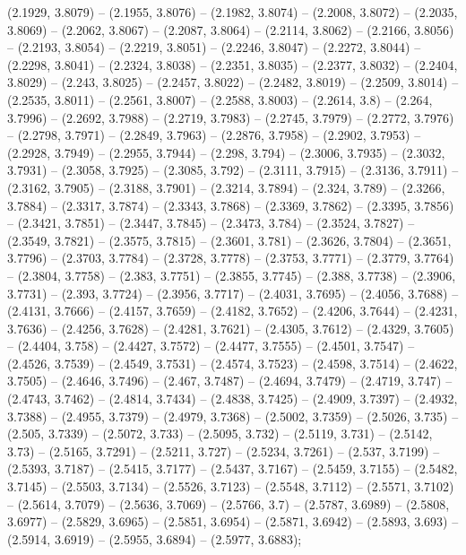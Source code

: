 (2.1929, 3.8079) -- (2.1955, 3.8076) -- (2.1982, 3.8074) -- (2.2008, 3.8072) -- (2.2035, 3.8069) -- (2.2062, 3.8067) -- (2.2087, 3.8064) -- (2.2114, 3.8062) -- (2.2166, 3.8056) -- (2.2193, 3.8054) -- (2.2219, 3.8051) -- (2.2246, 3.8047) -- (2.2272, 3.8044) -- (2.2298, 3.8041) -- (2.2324, 3.8038) -- (2.2351, 3.8035) -- (2.2377, 3.8032) -- (2.2404, 3.8029) -- (2.243, 3.8025) -- (2.2457, 3.8022) -- (2.2482, 3.8019) -- (2.2509, 3.8014) -- (2.2535, 3.8011) -- (2.2561, 3.8007) -- (2.2588, 3.8003) -- (2.2614, 3.8) -- (2.264, 3.7996) -- (2.2692, 3.7988) -- (2.2719, 3.7983) -- (2.2745, 3.7979) -- (2.2772, 3.7976) -- (2.2798, 3.7971) -- (2.2849, 3.7963) -- (2.2876, 3.7958) -- (2.2902, 3.7953) -- (2.2928, 3.7949) -- (2.2955, 3.7944) -- (2.298, 3.794) -- (2.3006, 3.7935) -- (2.3032, 3.7931) -- (2.3058, 3.7925) -- (2.3085, 3.792) -- (2.3111, 3.7915) -- (2.3136, 3.7911) -- (2.3162, 3.7905) -- (2.3188, 3.7901) -- (2.3214, 3.7894) -- (2.324, 3.789) -- (2.3266, 3.7884) -- (2.3317, 3.7874) -- (2.3343, 3.7868) -- (2.3369, 3.7862) -- (2.3395, 3.7856) -- (2.3421, 3.7851) -- (2.3447, 3.7845) -- (2.3473, 3.784) -- (2.3524, 3.7827) -- (2.3549, 3.7821) -- (2.3575, 3.7815) -- (2.3601, 3.781) -- (2.3626, 3.7804) -- (2.3651, 3.7796) -- (2.3703, 3.7784) -- (2.3728, 3.7778) -- (2.3753, 3.7771) -- (2.3779, 3.7764) -- (2.3804, 3.7758) -- (2.383, 3.7751) -- (2.3855, 3.7745) -- (2.388, 3.7738) -- (2.3906, 3.7731) -- (2.393, 3.7724) -- (2.3956, 3.7717) -- (2.4031, 3.7695) -- (2.4056, 3.7688) -- (2.4131, 3.7666) -- (2.4157, 3.7659) -- (2.4182, 3.7652) -- (2.4206, 3.7644) -- (2.4231, 3.7636) -- (2.4256, 3.7628) -- (2.4281, 3.7621) -- (2.4305, 3.7612) -- (2.4329, 3.7605) -- (2.4404, 3.758) -- (2.4427, 3.7572) -- (2.4477, 3.7555) -- (2.4501, 3.7547) -- (2.4526, 3.7539) -- (2.4549, 3.7531) -- (2.4574, 3.7523) -- (2.4598, 3.7514) -- (2.4622, 3.7505) -- (2.4646, 3.7496) -- (2.467, 3.7487) -- (2.4694, 3.7479) -- (2.4719, 3.747) -- (2.4743, 3.7462) -- (2.4814, 3.7434) -- (2.4838, 3.7425) -- (2.4909, 3.7397) -- (2.4932, 3.7388) -- (2.4955, 3.7379) -- (2.4979, 3.7368) -- (2.5002, 3.7359) -- (2.5026, 3.735) -- (2.505, 3.7339) -- (2.5072, 3.733) -- (2.5095, 3.732) -- (2.5119, 3.731) -- (2.5142, 3.73) -- (2.5165, 3.7291) -- (2.5211, 3.727) -- (2.5234, 3.7261) -- (2.537, 3.7199) -- (2.5393, 3.7187) -- (2.5415, 3.7177) -- (2.5437, 3.7167) -- (2.5459, 3.7155) -- (2.5482, 3.7145) -- (2.5503, 3.7134) -- (2.5526, 3.7123) -- (2.5548, 3.7112) -- (2.5571, 3.7102) -- (2.5614, 3.7079) -- (2.5636, 3.7069) -- (2.5766, 3.7) -- (2.5787, 3.6989) -- (2.5808, 3.6977) -- (2.5829, 3.6965) -- (2.5851, 3.6954) -- (2.5871, 3.6942) -- (2.5893, 3.693) -- (2.5914, 3.6919) -- (2.5955, 3.6894) -- (2.5977, 3.6883);



